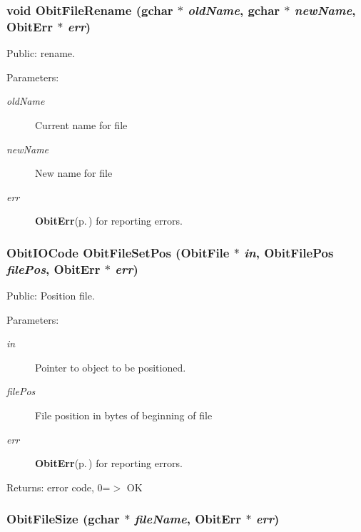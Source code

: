 \subsubsection{\setlength{\rightskip}{0pt plus 5cm}void Obit\-File\-Rename (gchar $\ast$ {\em old\-Name}, gchar $\ast$ {\em new\-Name}, {\bf Obit\-Err} $\ast$ {\em err})}\label{ObitFile_8h_a27}


Public: rename. 

\begin{Desc}
\item[Parameters:]
\begin{description}
\item[{\em old\-Name}]Current name for file \item[{\em new\-Name}]New name for file \item[{\em err}]{\bf Obit\-Err}{\rm (p.\,\pageref{structObitErr})} for reporting errors. \end{description}
\end{Desc}
\subsubsection{\setlength{\rightskip}{0pt plus 5cm}Obit\-IOCode Obit\-File\-Set\-Pos ({\bf Obit\-File} $\ast$ {\em in}, {\bf Obit\-File\-Pos} {\em file\-Pos}, {\bf Obit\-Err} $\ast$ {\em err})}\label{ObitFile_8h_a31}


Public: Position file. 

\begin{Desc}
\item[Parameters:]
\begin{description}
\item[{\em in}]Pointer to object to be positioned. \item[{\em file\-Pos}]File position in bytes of beginning of file \item[{\em err}]{\bf Obit\-Err}{\rm (p.\,\pageref{structObitErr})} for reporting errors. \end{description}
\end{Desc}
\begin{Desc}
\item[Returns:]error code, 0=$>$ OK \end{Desc}
\subsubsection{ Obit\-File\-Size (gchar $\ast$ {\em file\-Name}, {\bf Obit\-Err} $\ast$ {\em err})}\label{ObitFile_8h_a41}


